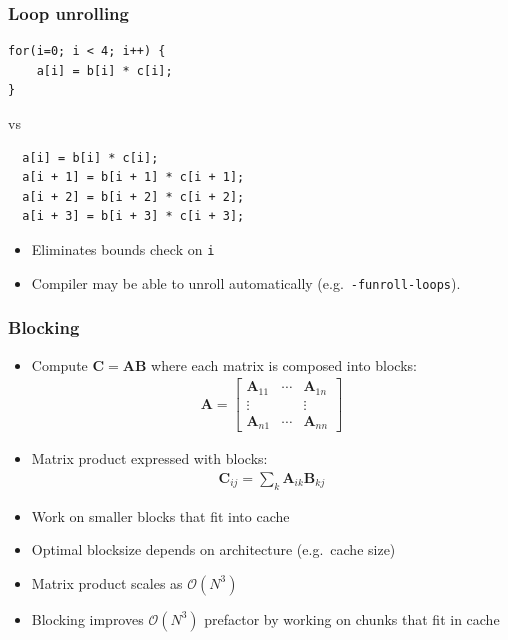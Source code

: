 \documentclass[usenames,dvipsnames,mathserif,compress]{beamer}
\begin{document}

\begin{frame}[fragile]
  \frametitle{Loop unrolling}
\begin{lstlisting}
for(i=0; i < 4; i++) {
    a[i] = b[i] * c[i];
}
\end{lstlisting}
vs
\begin{lstlisting}
  a[i] = b[i] * c[i];
  a[i + 1] = b[i + 1] * c[i + 1];
  a[i + 2] = b[i + 2] * c[i + 2];
  a[i + 3] = b[i + 3] * c[i + 3];
\end{lstlisting}
\begin{itemize}
\item Eliminates bounds check on \texttt{i}
\item Compiler may be able to unroll automatically (e.g.~\texttt{-funroll-loops}).
\end{itemize}
\end{frame}

\begin{frame}
  \frametitle{Blocking}
  \begin{itemize}
  \item
  Compute $\mathbf C = \mathbf A \mathbf B$ where each matrix is composed into
  blocks:
  \begin{align}
    \mathbf A = \left[
      \begin{matrix}
        \mathbf A_{11} &\cdots& \mathbf A_{1n}\\
        \vdots & & \vdots \\
        \mathbf A_{n1} & \cdots & \mathbf A_{nn}
      \end{matrix}\right]
  \end{align}

\item Matrix product expressed with blocks:
  \begin{align}
    \mathbf C_{ij} = \sum_{k} \mathbf A_{ik} \mathbf B_{kj}
  \end{align}
  \item Work on smaller blocks that fit into cache
  \item Optimal blocksize depends on architecture (e.g.\ cache size)
  \item Matrix product scales as $\mathcal O(N^3)$
  \item Blocking improves $\mathcal O(N^3)$ prefactor by working on
    chunks that fit in cache
  \end{itemize}
\end{frame}
\end{document}
